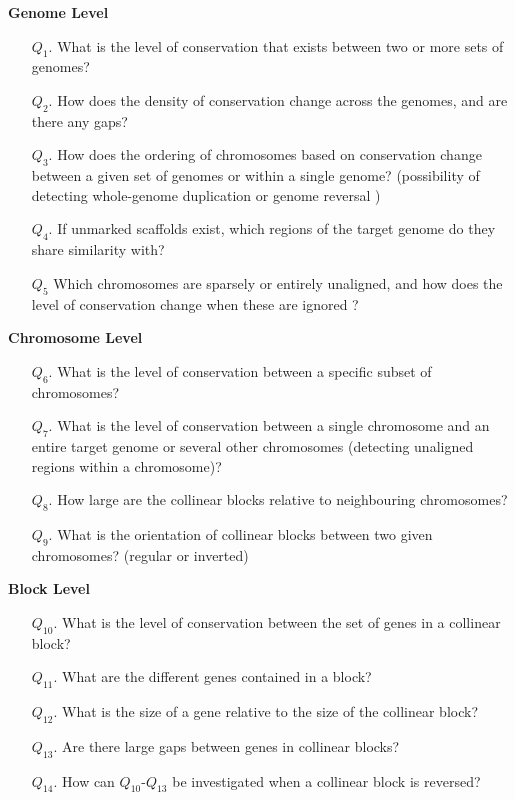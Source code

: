 \smallskip
\noindent
\textbf{Genome Level}
\smallskip
\begin{enumerate}
\item [$Q_1$.] What is the level of conservation that exists between two or more sets of genomes?
\item [$Q_2$.] How does the density of conservation change across the genomes, and are there any gaps?
\item [$Q_3$.] How does the ordering of chromosomes based on conservation change between a given set of genomes or within a single genome? (possibility of detecting whole-genome duplication or genome reversal )
\item [$Q_4$.] If unmarked scaffolds exist, which regions of the target genome do they share similarity with?
\item[$Q_5$] Which chromosomes are sparsely or entirely unaligned, and how does the level of conservation change when these are ignored ?
\end{enumerate}

\smallskip
\noindent
\textbf{Chromosome Level}
\smallskip
\begin{enumerate}
\item [$Q_6$.]What is the level of conservation between a specific subset of chromosomes?
\item [$Q_7$.] What is the level of conservation between a single chromosome and an entire target genome or several other chromosomes (detecting unaligned regions within a chromosome)?
\item [$Q_8$.] 
How large are the collinear blocks relative to neighbouring chromosomes?
\item [$Q_9$.]What is the orientation of collinear blocks between two given chromosomes? (regular or inverted)
\end{enumerate}

\smallskip
\noindent
\textbf{Block Level}
\smallskip
\begin{enumerate}
\item [$Q_{10}$.]What is the level of conservation between the set of genes in a collinear block?
\item [$Q_{11}$.] What are the different genes contained in a block?
\item [$Q_{12}$.] What is the size of a gene relative to the size of the collinear block?
\item [$Q_{13}$.] Are there large gaps between genes in collinear blocks?
\item [$Q_{14}$.] How can $Q_{10}$-$Q_{13}$ be investigated when a collinear block is reversed?
\end{enumerate}


